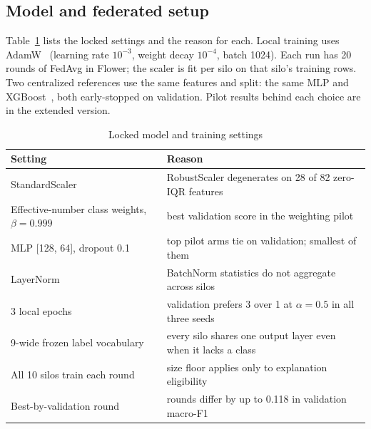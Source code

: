 \documentclass[conference]{IEEEtran}
\newif\iffullversion
\newcommand{\fullref}[1]{\iffullversion Appendix~\ref{#1}\else the extended version\fi}
\begin{document}
\subsection{Model and federated setup}
Table~\ref{tab:locked} lists the locked settings and the reason for each. Local
training uses AdamW~\cite{loshchilov2019} (learning rate $10^{-3}$, weight decay %
$10^{-4}$, batch 1024). Each run has 20 rounds of FedAvg in Flower; the scaler is fit %
per silo on that silo's training rows. Two centralized references use the same features
and split: the same MLP and XGBoost~\cite{chen2016xgb}, both early-stopped on
validation. Pilot results behind each choice are in \fullref{app:model}.

\begin{table}[t]
\centering
\caption{Locked model and training settings}
\label{tab:locked}
\footnotesize
\begin{tabularx}{\columnwidth}{@{}>{\raggedright}p{2.5cm}X@{}}
\toprule
Setting & Reason\\
\midrule
StandardScaler & RobustScaler degenerates on 28 of 82 zero-IQR features\\ %
Effective-number class weights, $\beta=0.999$~\cite{cui2019} & best validation score in the weighting pilot\\ %
MLP [128, 64], dropout 0.1 & top pilot arms tie on validation; smallest of them\\ %
LayerNorm~\cite{ba2016} & BatchNorm statistics do not aggregate across silos\\
3 local epochs & validation prefers 3 over 1 at $\alpha=0.5$ in all three seeds\\ %
9-wide frozen label vocabulary & every silo shares one output layer even when it lacks a class\\ %
All 10 silos train each round & size floor applies only to explanation eligibility\\ %
Best-by-validation round & rounds differ by up to 0.118 in validation macro-F1\\ %
\bottomrule
\end{tabularx}
\end{table}
\end{document}
